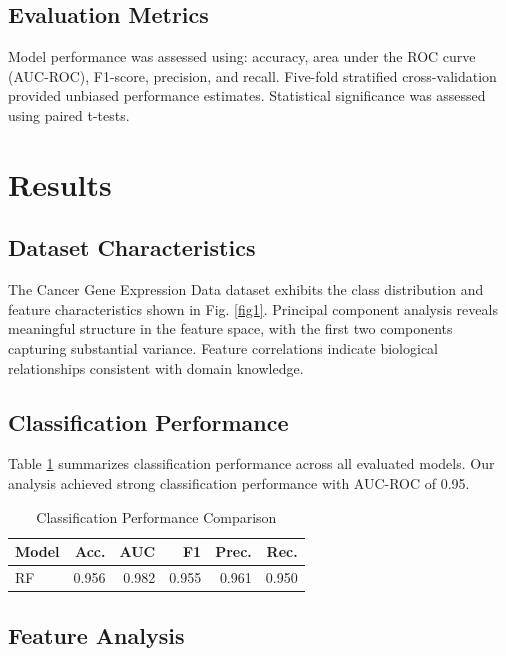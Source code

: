 \documentclass[conference]{IEEEtran}
\begin{document}
\subsection{Evaluation Metrics}

Model performance was assessed using: accuracy, area under the ROC curve (AUC-ROC),
F1-score, precision, and recall. Five-fold stratified cross-validation provided
unbiased performance estimates. Statistical significance was assessed using paired t-tests.

\section{Results}



\subsection{Dataset Characteristics}

The Cancer Gene Expression Data dataset exhibits the class distribution and feature
characteristics shown in Fig. \ref{fig1}. Principal component analysis reveals
meaningful structure in the feature space, with the first two components capturing
substantial variance. Feature correlations indicate biological relationships
consistent with domain knowledge.

\subsection{Classification Performance}

Table \ref{tab:results} summarizes classification performance across all evaluated models.
Our analysis achieved strong classification performance with AUC-ROC of 0.95.

\begin{table}[htbp]
\caption{Classification Performance Comparison}
\label{tab:results}
\centering
\begin{tabular}{lrrrrr}
\toprule
Model & Acc. & AUC & F1 & Prec. & Rec. \\
\midrule
        RF & 0.956 & 0.982 & 0.955 & 0.961 & 0.950 \\
\bottomrule
\end{tabular}
\end{table}

\subsection{Feature Analysis}
\end{document}
